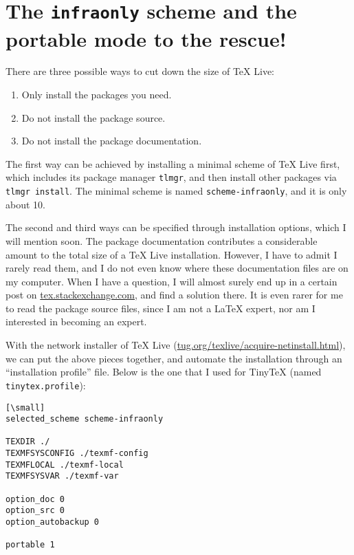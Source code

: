 \documentclass{ltugboat}
\begin{document}
\hypertarget{the-infraonly-scheme-and-the-portable-mode-to-the-rescue}{%
\section{\texorpdfstring{The \texttt{infraonly} scheme and the portable
mode to the
rescue!}{The infraonly scheme and the portable mode to the rescue!}}\label{the-infraonly-scheme-and-the-portable-mode-to-the-rescue}}

There are three possible ways to cut down the size of \TeX{} Live:

\begin{enumerate}
\def\labelenumi{\arabic{enumi}.}
\item
  Only install the packages you need.
\item
  Do not install the package source.
\item
  Do not install the package documentation.
\end{enumerate}

The first way can be achieved by installing a minimal scheme of \TeX{} Live
first, which includes its package manager \texttt{tlmgr}, and then
install other packages via \texttt{tlmgr\ install}. The minimal scheme
is named \texttt{scheme-infraonly}, and it is only about 10.

The second and third ways can be specified through installation options,
which I will mention soon. The package documentation contributes a
considerable amount to the total size of a \TeX{} Live installation.
However, I have to admit I rarely read them, and I do not even know
where these documentation files are on my computer. When I have a
question, I will almost surely end up in a certain post on
\url{tex.stackexchange.com}, and find a solution there. It is
even rarer for me to read the package source files, since I am not a
\LaTeX{} expert, nor am I interested in becoming an expert.

With the network installer of \TeX{} Live
(\url{tug.org/texlive/acquire-netinstall.html}), we can put the
above pieces together, and automate the installation through an
``installation profile'' file. Below is the one that I used for TinyTeX
(named \texttt{tinytex.profile}):

\begin{verbatim}[\small]
selected_scheme scheme-infraonly

TEXDIR ./
TEXMFSYSCONFIG ./texmf-config
TEXMFLOCAL ./texmf-local
TEXMFSYSVAR ./texmf-var

option_doc 0
option_src 0
option_autobackup 0

portable 1
\end{verbatim}
\end{document}
